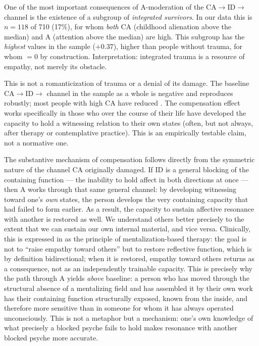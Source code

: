 One of the most important consequences of A-moderation of the CA$\to$ID$\to$\EAF{} channel is the existence of a subgroup of \emph{integrated survivors}. In our data this is $n = 118$ of 710 (17\%), for whom \emph{both} CA (childhood alienation above the median) and A (attention above the median) are high. This subgroup has the \emph{highest} \EAF{} values in the sample ($+0.37$), higher than people without trauma, for whom \EAF{} $= 0$ by construction. Interpretation: integrated trauma is a resource of empathy, not merely its obstacle.

This is not a romanticization of trauma or a denial of its damage. The baseline CA$\to$ID$\to$\EAF{} channel in the sample as a whole is negative and reproduces robustly; most people with high CA have reduced \EAF{}. The compensation effect works specifically in those who over the course of their life have developed the capacity to hold a witnessing relation to their own states (often, but not always, after therapy or contemplative practice). This is an empirically testable claim, not a normative one.

The substantive mechanism of compensation follows directly from the symmetric nature of the channel CA originally damaged. If ID is a general blocking of the containing function --- the inability to hold affect in both directions at once --- then A works through that same general channel: by developing witnessing toward one's \emph{own} states, the person develops the very containing capacity that had failed to form earlier. As a result, the capacity to sustain affective resonance with another is restored as well. We understand others better precisely to the extent that we can sustain our own internal material, and vice versa. Clinically, this is expressed in \citet{fonagy2002} as the principle of mentalization-based therapy: the goal is not to ``raise empathy toward others'' but to restore reflective function, which is by definition bidirectional; when it is restored, empathy toward others returns as a consequence, not as an independently trainable capacity. This is precisely why the path through A yields \EAF{} \emph{above} baseline: a person who has moved through the structural absence of a mentalizing field and has assembled it by their own work has their containing function structurally exposed, known from the inside, and therefore more sensitive than in someone for whom it has always operated unconsciously. This is not a metaphor but a mechanism: one's own knowledge of what precisely a blocked psyche fails to hold makes resonance with another blocked psyche more accurate.

